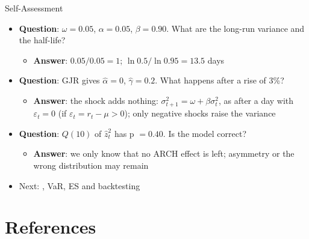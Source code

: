 \begin{frame}{Self-Assessment}
\itemsize{\small}
\begin{itemize}
    \item \textbf{Question}: $\omega = 0.05$, $\alpha = 0.05$, $\beta = 0.90$. What are the long-run variance and the half-life?
    \begin{itemize}
        \item \textbf{Answer}: $0.05/0.05 = 1$; $\ln 0.5/\ln 0.95 = 13.5$ days
    \end{itemize}
    \item \textbf{Question}: GJR gives $\hat\alpha = 0$, $\hat\gamma = 0.2$. What happens after a rise of 3\%?
    \begin{itemize}
        \item \textbf{Answer}: the shock adds nothing: $\sigma_{t+1}^2 = \omega + \beta\sigma_t^2$, as after a day with $\varepsilon_t = 0$ (if $\varepsilon_t = r_t - \mu > 0$); only negative shocks raise the variance
    \end{itemize}
    \item \textbf{Question}: $Q(10)$ of $\hat z_t^2$ has p $= 0.40$. Is the model correct?
    \begin{itemize}
        \item \textbf{Answer}: we only know that no ARCH effect is left; asymmetry or the wrong distribution may remain
    \end{itemize}
    \item Next: , VaR, ES and backtesting
\end{itemize}
\end{frame}


\section{References}

